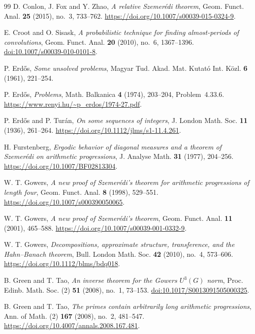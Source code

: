 \begin{thebibliography}{99}
D. Conlon, J. Fox and Y. Zhao, \emph{A relative Szemer\'edi theorem},
Geom. Funct. Anal. \textbf{25} (2015), no.~3, 733--762.
\url{https://doi.org/10.1007/s00039-015-0324-9}.

E. Croot and O. Sisask, \emph{A probabilistic technique for finding
almost-periods of convolutions},
Geom. Funct. Anal. \textbf{20} (2010), no.~6, 1367--1396.
\href{https://doi.org/10.1007/s00039-010-0101-8}{doi:10.1007/s00039-010-0101-8}.

P. Erd\H{o}s, \emph{Some unsolved problems},
Magyar Tud. Akad. Mat. Kutat\'o Int. K\"ozl. \textbf{6} (1961), 221--254.

P. Erd\H{o}s, \emph{Problems}, Math. Balkanica \textbf{4} (1974),
203--204, Problem~4.33.6.
\url{https://www.renyi.hu/~p_erdos/1974-27.pdf}.

P. Erd\H{o}s and P. Tur\'an, \emph{On some sequences of integers},
J. London Math. Soc. \textbf{11} (1936), 261--264.
\url{https://doi.org/10.1112/jlms/s1-11.4.261}.

H. Furstenberg, \emph{Ergodic behavior of diagonal measures and a theorem
of Szemer\'edi on arithmetic progressions}, J. Analyse Math. \textbf{31}
(1977), 204--256. \url{https://doi.org/10.1007/BF02813304}.

W. T. Gowers, \emph{A new proof of Szemer\'edi's theorem for arithmetic
progressions of length four}, Geom. Funct. Anal. \textbf{8} (1998), 529--551.
\url{https://doi.org/10.1007/s000390050065}.

W. T. Gowers, \emph{A new proof of Szemer\'edi's theorem},
Geom. Funct. Anal. \textbf{11} (2001), 465--588.
\url{https://doi.org/10.1007/s00039-001-0332-9}.

W. T. Gowers, \emph{Decompositions, approximate structure, transference,
and the Hahn--Banach theorem}, Bull. London Math. Soc. \textbf{42}
(2010), no.~4, 573--606.
\url{https://doi.org/10.1112/blms/bdq018}.

B. Green and T. Tao, \emph{An inverse theorem for the Gowers $U^3(G)$ norm},
Proc. Edinb. Math. Soc. (2) \textbf{51} (2008), no.~1, 73--153.
\href{https://doi.org/10.1017/S0013091505000325}{doi:10.1017/S0013091505000325}.

B. Green and T. Tao, \emph{The primes contain arbitrarily long arithmetic
progressions}, Ann. of Math. (2) \textbf{167} (2008), no.~2, 481--547.
\url{https://doi.org/10.4007/annals.2008.167.481}.


\end{thebibliography}
